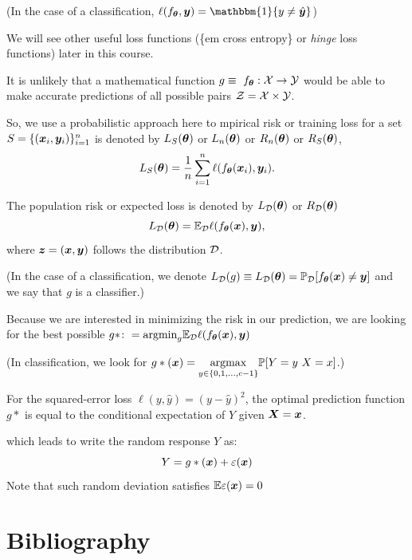 \documentclass{beamer}
\begin{document}
\begin{frame}[allowframebreaks]
  (In the case of a classification, $\ell(f_{\vtheta},\vy)=\mathbbm{1}\{y\neq \hat{\vy}\}$)

We will see other useful loss functions (\{em cross entropy\} or {\em hinge} loss functions) later in this course.

It is unlikely that a mathematical function $g \equiv \ f_{\bm{\theta}}:\mathcal{X}\to\mathcal{Y}$ would be able to make accurate predictions of all possible pairs $\mathcal{Z}=\mathcal{X}\times\mathcal{Y}$.

  So, we use a probabilistic approach here to mpirical risk or training loss for a set $S=\{(\bm{x}_i,\bm{y}_i)\}_{i=1}^{n}$ is denoted by  $L_S(\bm{\theta})$ or $L_{n}(\bm{\theta})$ or $R_{n}(\bm{\theta})$ or $R_{S}(\bm{\theta})$,
  \begin{equation}
      L_S(\bm{\theta}) =\frac{1}{n}\sum_{i=1}^n\ell(f_{\bm{\theta}}(\bm{x}_i),\bm{y}_i).
  \end{equation}
  
  The population risk or expected loss is denoted by $L_{\mathcal{D}}(\bm{\theta})$ or $R_{\mathcal{D}}(\bm{\theta})$
  \begin{equation}
      L_{\mathcal{D}}(\bm{\theta}) =\mathbb{E}_{\mathcal{D}}\ell(f_{\bm{\theta}}(\bm{x}),\bm{y}),
  \end{equation}
  where $\bm{z}=(\bm{x},\bm{y})$ follows the distribution $\mathcal{D}$.
   
  (In the case of a classification, we denote $L_{\mathcal{D}}(g) \equiv L_{\mathcal{D}}(\bm{\theta}) = \mathbb{P}_{\mathcal{D}} [f_{\bm{\theta}}(\bm{x}) \neq \bm{y}]$ and we say that $g$ is a classifier.)

  Because we are interested in minimizing the risk in our prediction, we are looking for the best possible $g* \colon = \mathrm{argmin}_g \mathbb{E}_{\mathcal{D}}\ell(f_{\bm{\theta}}(\bm{x}),\bm{y})$

  (In classification, we look for $g* (\vx) = \underset{y\in\{0,1,\ldots,c-1\}}{\mathrm{argmax}}  \Prob[Y=y \ X=x]$.)

  \begin{theorem}
    For the squared-error loss $\ell (y,\hat{y})=(y-\hat{y})^2$, the optimal prediction function $g*$ is equal to the conditional expectation of $Y$ given $\bm{X}=\bm{x}$.
  \end{theorem}
  which leads to write the random response $Y$ as:
  \[Y=g*(\bm{x})+\varepsilon(\bm{x})\]
  Note that such random deviation satisfies $\mathbb{E} \varepsilon(\bm{x})=0$
\end{frame}


\section{Bibliography}


\end{document}
